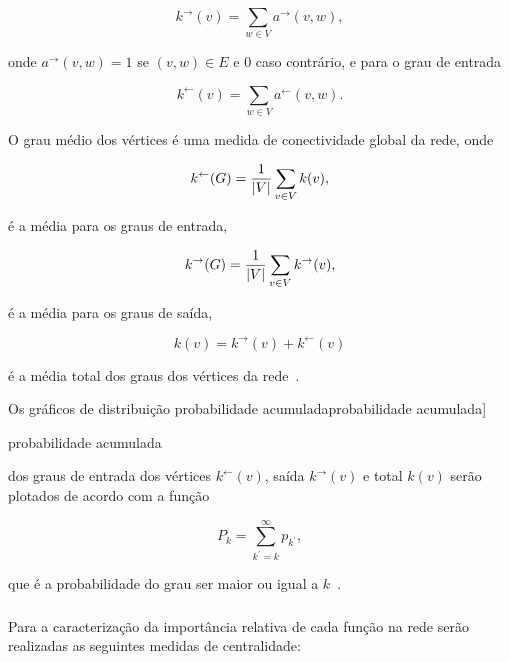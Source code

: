 \documentclass[a4paper,12pt,twoside]{article}
\def\degreelabel{k}
\def\degree#1{\degreelabel(#1)}
\def\degreein#1{\degreelabel^\leftarrow(#1)}
\def\degreeout#1{\degreelabel^\rightarrow(#1)}
\renewcommand\marginpar[1]{}
\let\oldmarginpar\marginpar
\renewcommand\marginpar[1]{\-\oldmarginpar[\raggedleft\footnotesize #1]%
{\raggedright\footnotesize #1}}
\begin{document}
\begin{displaymath}
  \label{eq:k}
  \degreeout{v} = \sum_{w \in V} {a^\rightarrow(v,w)},
\end{displaymath}


\noindent onde ${a^\rightarrow(v,w)} = 1$ se $(v,w) \in E$ e $0$ caso contrário, 
 e para o grau de entrada

\begin{displaymath}
  \label{eq:kin}
    \degreein{v} = \sum_{w\in V} a^\leftarrow(v,w).
\end{displaymath}

O grau médio dos vértices é uma medida de conectividade global da
rede, onde

\begin{displaymath}
  \label{eq:avgin}
    \degreein{G} =  {1 \over |V|} \sum_{v\in V}\degree{v},
\end{displaymath}

\noindent é a média para os graus de entrada,

\begin{displaymath}
  \label{eq:avgout}
   \degreeout{G} =  {1 \over |V|} \sum_{v\in V}\degreeout{v},
\end{displaymath}

\noindent é a média para os graus de saída,

\begin{equation}
  \label{eq:avg}
   \degree{v} =  \degreeout{v}  + \degreein{v} 
\end{equation}

\noindent é a média total dos graus dos vértices da rede~\cite{costa-2007}.

Os gráficos de distribuição probabilidade
acumulada\marginpar{probabilidade acumulada} dos graus de entrada dos
vértices $\degreein{v}$, saída $\degreeout{v}$ e total $\degree{v}$
serão plotados de acordo com a função

\begin{equation}
  \label{eq:prob}
  P_k=\sum_{k^\prime=k}^{\infty}p_{k^\prime},
\end{equation}

\noindent que é a probabilidade do grau ser maior ou igual a
$k$~\cite{newman-2003-45}.

\subsubsection{\centr}
\label{s:centralidade}

Para a caracterização da importância relativa de cada função na rede
 serão realizadas as seguintes medidas de centralidade:
\end{document}
